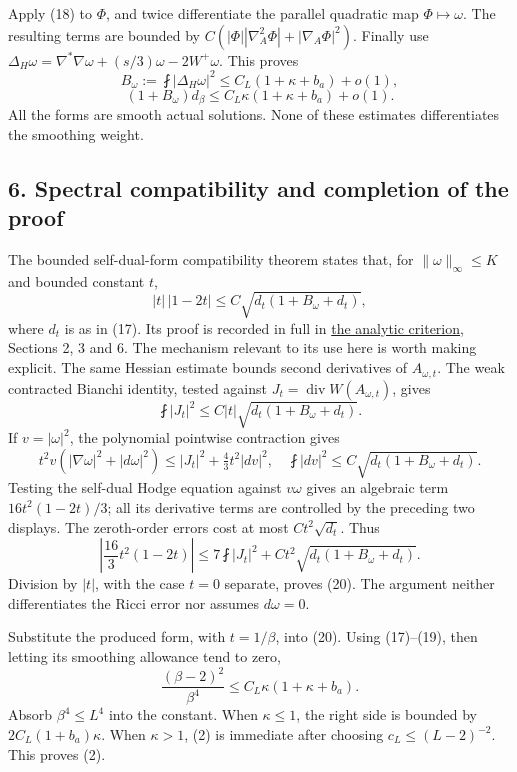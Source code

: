\documentclass[
  11pt,
]{article}
\begin{document}
Apply (18) to \(\Phi\), and twice differentiate the parallel quadratic
map \(\Phi\mapsto\omega\). The resulting terms are bounded by
\(C(|\Phi||\nabla_A^2\Phi|+|\nabla_A\Phi|^2)\). Finally use
\(\Delta_H\omega=\nabla^*\nabla\omega+(s/3)\omega-2W^+\omega\). This
proves \[
B_\omega:=\fint|\Delta_H\omega|^2
\le C_L(1+\kappa+b_a)+o(1),
\] \[
\boxed{(1+B_\omega)d_\beta
\le C_L\kappa(1+\kappa+b_a)+o(1).}
\tag{19}
\] All the forms are smooth actual solutions. None of these estimates
differentiates the smoothing weight.

\hypertarget{spectral-compatibility-and-completion-of-the-proof}{%
\subsection{6. Spectral compatibility and completion of the
proof}\label{spectral-compatibility-and-completion-of-the-proof}}

The bounded self-dual-form compatibility theorem states that, for
\(\|\omega\|_\infty\le K\) and bounded constant \(t\), \[
|t|\,|1-2t|
\le C\sqrt{d_t(1+B_\omega+d_t)},
\tag{20}
\] where \(d_t\) is as in (17). Its proof is recorded in full in
\href{round21_analytic.md}{the analytic criterion}, Sections 2, 3 and 6.
The mechanism relevant to its use here is worth making explicit. The
same Hessian estimate bounds second derivatives of \(A_{\omega,t}\). The
weak contracted Bianchi identity, tested against
\(J_t=\operatorname{div}W(A_{\omega,t})\), gives \[
\fint|J_t|^2\le C|t|\sqrt{d_t(1+B_\omega+d_t)}.
\] If \(v=|\omega|^2\), the polynomial pointwise contraction gives \[
t^2v(|\nabla\omega|^2+|d\omega|^2)
\le |J_t|^2+\tfrac43t^2|dv|^2,
\quad
\fint|dv|^2\le C\sqrt{d_t(1+B_\omega+d_t)}.
\] Testing the self-dual Hodge equation against \(v\omega\) gives an
algebraic term \(16t^2(1-2t)/3\); all its derivative terms are
controlled by the preceding two displays. The zeroth-order errors cost
at most \(Ct^2\sqrt{d_t}\). Thus \[
\left|\frac{16}{3}t^2(1-2t)\right|
\le7\fint|J_t|^2+C t^2\sqrt{d_t(1+B_\omega+d_t)}.
\] Division by \(|t|\), with the case \(t=0\) separate, proves (20). The
argument neither differentiates the Ricci error nor assumes
\(d\omega=0\).

Substitute the produced form, with \(t=1/\beta\), into (20). Using
(17)--(19), then letting its smoothing allowance tend to zero, \[
\frac{(\beta-2)^2}{\beta^4}
\le C_L\kappa(1+\kappa+b_a).
\tag{21}
\] Absorb \(\beta^4\le L^4\) into the constant. When \(\kappa\le1\), the
right side is bounded by \(2C_L(1+b_a)\kappa\). When \(\kappa>1\), (2)
is immediate after choosing \(c_L\le(L-2)^{-2}\). This proves (2).
\end{document}

